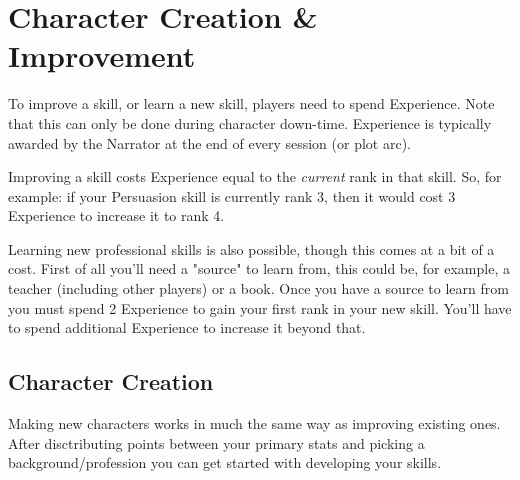     
    

\clearpage
\section{Character Creation \& Improvement}
To improve a skill, or learn a new skill, players need to spend Experience.
Note that this can only be done during character down-time.
Experience is typically awarded by the Narrator at the end of every session (or plot arc).

Improving a skill costs Experience equal to the \textit{current} rank in that skill.
So, for example: if your Persuasion skill is currently rank 3, then it would cost 3 Experience to increase it to rank 4.

Learning new professional skills is also possible, though this comes at a bit of a cost.
First of all you'll need a "source" to learn from, 
this could be, for example, a teacher (including other players) or a book.
Once you have a source to learn from you must spend 2 Experience to gain your first rank in your new skill.
You'll have to spend additional Experience to increase it beyond that.

\subsection{Character Creation}
Making new characters works in much the same way as improving existing ones.
After disctributing points between your primary stats and picking a background/profession
you can get started with developing your skills.

